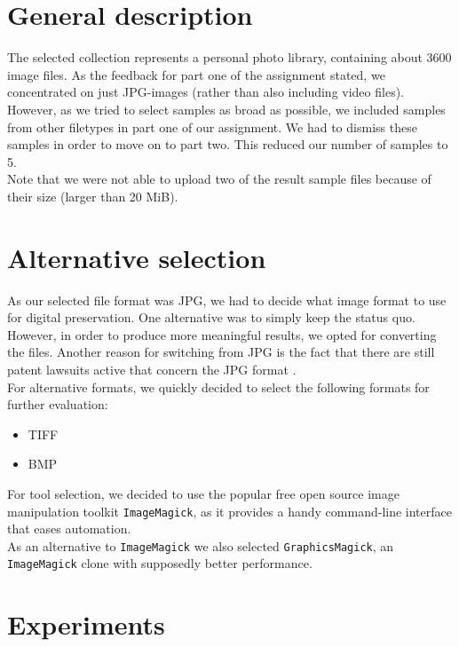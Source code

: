 \section{General description}

The selected collection represents a personal photo library, containing about
3600 image files. As the feedback for part one of the assignment stated, we
concentrated on just JPG-images (rather than also including video files).\\

However, as we tried to select samples as broad as possible, we included samples
from other filetypes in part one of our assignment. We had to dismiss these
samples in order to move on to part two. This reduced our number of samples to
5.\\

Note that we were not able to upload two of the result sample files because of
their size (larger than 20 MiB).

\section{Alternative selection}

As our selected file format was JPG, we had to decide what image format to use
for digital preservation. One alternative was to simply keep the status quo.
However, in order to produce more meaningful results, we opted for converting
the files. Another reason for switching from JPG is the fact that there are
still patent lawsuits active that concern the JPG format \cite{digpres:2013}.\\

For alternative formats, we quickly decided to select the following formats for
further evaluation:

\begin{itemize}
    \item TIFF
    \item BMP
\end{itemize}

For tool selection, we decided to use the popular free open source image
manipulation toolkit \texttt{ImageMagick}, as it provides a handy command-line
interface that eases automation.\\

As an alternative to \texttt{ImageMagick} we also selected
\texttt{GraphicsMagick}, an \texttt{ImageMagick} clone with supposedly better
performance.

\section{Experiments}

